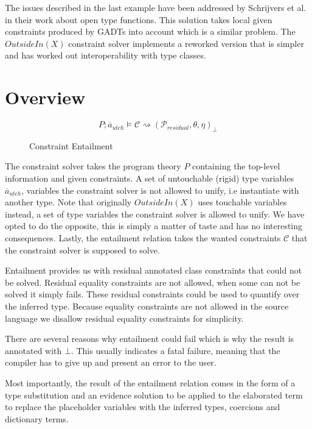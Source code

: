 The issues described in the last example have been addressed by Schrijvers et
al.~\cite{type-checking-with-open-type-functions} in their work about open type
functions. This solution takes local given constraints produced by GADTs into
account which is a similar problem. The $OutsideIn(X)$ constraint solver
implements a reworked version that is simpler and has worked out
interoperability with type classes.

\section{Overview}

\begin{figure}
\[ %
P ; \overline{a}_{utch} \vDash \mathcal{C} \rightsquigarrow
(\mathcal{P}_{residual}, \theta, \eta)_\bot
\]
\caption{Constraint Entailment}
\end{figure}

The constraint solver takes the program theory $P$ containing the top-level
information and given constraints. A set of untouchable (rigid) type variables
$\overline{a}_{utch}$, variables the constraint solver is not allowed to unify,
i.e instantiate with another type. Note that originally $OutsideIn(X)$ uses
touchable variables instead, a set of type variables the constraint solver is
allowed to unify. We have opted to do the opposite, this is simply a matter of
taste and has no interesting consequences.  Lastly, the entailment relation
takes the wanted constraints $\mathcal{C}$ that the constraint solver is
supposed to solve.

Entailment provides us with residual annotated class constraints that could not
be solved. Residual equality constraints are not allowed, when some can not be
solved it simply fails. These residual constraints could be used to quantify
over the inferred type. Because equality constraints are not allowed in the
source language we disallow residual equality constraints for simplicity.

There are several reasons why entailment could fail which is why the result is
annotated with $\bot$. This usually indicates a fatal failure, meaning that the
compiler has to give up and present an error to the user.

Most importantly, the result of the entailment relation comes in the form of a
type substitution and an evidence solution to be applied to the elaborated
\systemfc term to replace the placeholder variables with the inferred types,
coercions and dictionary terms.

